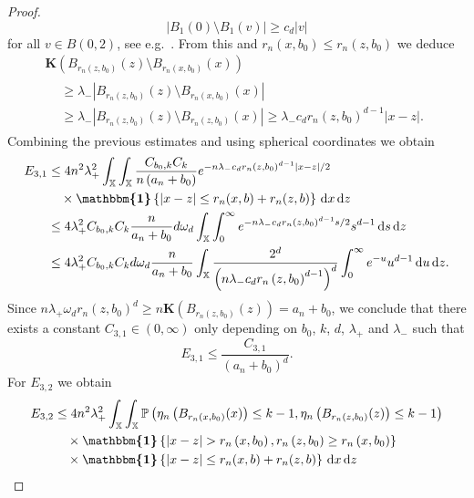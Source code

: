\documentclass[10pt]{amsart}
\theoremstyle{definition}\newtheorem{defi}[theo]{Definition}\newtheorem{rema}[theo]{Remark}\newtheorem{exam}[theo]{Example}\newtheorem{exem}[theo]{Example}\newtheorem{nota}[theo]{Notation}
\newcommand*\bK{\mathbf{K}}
\renewcommand*\P{\mathbb{P}}
\newcommand*\X{\mathbb{X}}
\newcommand*\md{\mathrm{d}}
\newcommand{\ind}{\boldsymbol{\mathbbm{1}}}
\newcommand{\set}[1]{\left\{#1\right\}}
\newcommand{\prob}[1]{\P\left(#1\right)}
\begin{document}
\begin{proof}
\[
\left|B_1(0)\setminus B_1(v)\right| \geq c_d |v|
\]
for all $v\in B(0,2)$, see e.g.~\cite[Equation~(7.5)]{PenroseGoldstein2010}. From this and $r_n(x,b_0) \leq r_n(z,b_0)$ we deduce
\begin{multline*}
\bK\left(B_{r_n\left(z,b_0\right)}(z)\setminus B_{r_n\left(x,b_0\right)}(x)\right)\\
\begin{aligned} 
& \geq \lambda_{-} \left|B_{r_n\left(z,b_0\right)}(z)\setminus B_{r_n\left(x,b_0\right)}(x)\right| \\
& \geq \lambda_{-}\left|B_{r_n\left(z,b_0\right)}(z)\setminus B_{r_n\left(z,b_0\right)}(x)\right| \geq \lambda_{-} c_d r_n\left(z,b_0\right)^{d-1} |x-z|.
\end{aligned}
\end{multline*}
Combining the previous estimates and using spherical coordinates we obtain
\begin{align*}
E_{3,1} & \leq {4} n^2 \lambda_+^2 \int_{\X}\int_{\X} \frac{C_{b_0,k} C_k}{n\left(a_n+b_0\right)} e^{-n \lambda_{-} c_d r_n\left(z,b_0\right)^{d-1} |x-z|/2} \\
&\quad\times\ind\set{|x-z| \leq r_n(x,b) + r_n(z,b)} \, \md x \, \md z \\
& \leq {4} \lambda_{+}^2C_{b_0,k}C_k\frac{n}{a_n+b_0} d\omega_d \int_{\X} \int_0^\infty e^{-n \lambda_{-} c_d r_n\left(z,b_0\right)^{d-1} s/2} s^{d-1} \, \md s \, \md z \\
& \leq {4} \lambda_{+}^2C_{b_0,k} C_k d\omega_d \frac{n}{a_n+b_0} \int_{\X} \frac{2^d}{\left(n \lambda_{-}c_d r_n\left(z,b_0\right)^{d-1}\right)^d} \int_0^\infty e^{-u} u^{d-1} \, \md u \, \md z.
\end{align*}
Since $n \lambda_{+} \omega_d r_n(z,b_0)^d\geq n\bK(B_{r_n(z,b_0)}(z)) = a_n + b_0$, we conclude that there exists a constant $C_{3,1}\in (0,\infty)$ only depending on $b_0$, $k$, $d$, $\lambda_+$ and $\lambda_-$ such that
\begin{equation}\label{e:kNNE31}
E_{3,1} \leq \frac{C_{3,1}}{\left(a_n+b_0\right)^d}.
\end{equation}
For $E_{3,2}$ we obtain
\begin{align*}
E_{3,2}
&\leq {4} n^2 \lambda_+^2 \int_{\X}\int_{\X} \prob{\eta_n \left(B_{r_n\left(x,b_0\right)}(x)\right) \leq k-1, \eta_n\left(B_{r_n\left(z,b_0\right)}(z)\right) \leq k-1} \\
& \quad\times \ind\set{|x-z|> r_n\left(x,b_0\right), r_n\left(z,b_0\right)\geq r_n\left(x,b_0\right)}\\
&\quad\times\ind\set{|x-z| \leq r_n(x,b) + r_n(z,b)} \, \md x \, \md z \\

\end{align*}
\end{proof}
\end{document}
